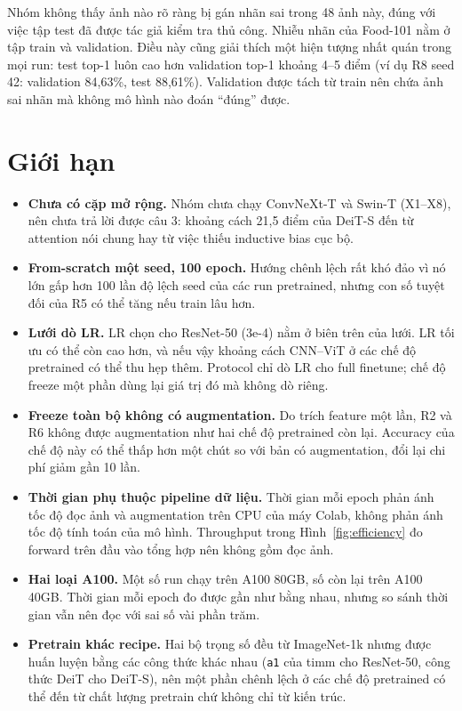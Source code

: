 \documentclass[12pt,a4paper]{article}
\begin{document}
Nhóm không thấy ảnh nào rõ ràng bị gán nhãn sai trong 48 ảnh này, đúng với việc tập
test đã được tác giả kiểm tra thủ công. Nhiễu nhãn của Food-101 nằm ở tập train và
validation. Điều này cũng giải thích một hiện tượng nhất quán trong mọi run: test
top-1 luôn cao hơn validation top-1 khoảng 4--5 điểm (ví dụ R8 seed 42: validation
84,63\%, test 88,61\%). Validation được tách từ train nên chứa ảnh sai nhãn mà không
mô hình nào đoán ``đúng'' được.

\section{Giới hạn}
\label{sec:limits}

\begin{itemize}
\item \textbf{Chưa có cặp mở rộng.} Nhóm chưa chạy ConvNeXt-T và Swin-T (X1--X8), nên
chưa trả lời được câu 3: khoảng cách 21,5 điểm của DeiT-S đến từ attention nói chung
hay từ việc thiếu inductive bias cục bộ.
\item \textbf{From-scratch một seed, 100 epoch.} Hướng chênh lệch rất khó đảo vì nó
lớn gấp hơn 100 lần độ lệch seed của các run pretrained, nhưng con số tuyệt đối của
R5 có thể tăng nếu train lâu hơn.
\item \textbf{Lưới dò LR.} LR chọn cho ResNet-50 (3e-4) nằm ở biên trên của lưới. LR
tối ưu có thể còn cao hơn, và nếu vậy khoảng cách CNN--ViT ở các chế độ pretrained có
thể thu hẹp thêm. Protocol chỉ dò LR cho full finetune; chế độ freeze một phần dùng
lại giá trị đó mà không dò riêng.
\item \textbf{Freeze toàn bộ không có augmentation.} Do trích feature một lần, R2 và R6
không được augmentation như hai chế độ pretrained còn lại. Accuracy của chế độ này có
thể thấp hơn một chút so với bản có augmentation, đổi lại chi phí giảm gần 10 lần.
\item \textbf{Thời gian phụ thuộc pipeline dữ liệu.} Thời gian mỗi epoch phản ánh tốc
độ đọc ảnh và augmentation trên CPU của máy Colab, không phản ánh tốc độ tính toán của
mô hình. Throughput trong Hình~\ref{fig:efficiency} đo forward trên đầu vào tổng hợp
nên không gồm đọc ảnh.
\item \textbf{Hai loại A100.} Một số run chạy trên A100 80GB, số còn lại trên A100
40GB. Thời gian mỗi epoch đo được gần như bằng nhau, nhưng so sánh thời gian vẫn nên
đọc với sai số vài phần trăm.
\item \textbf{Pretrain khác recipe.} Hai bộ trọng số đều từ ImageNet-1k nhưng được huấn
luyện bằng các công thức khác nhau (\texttt{a1} của timm cho ResNet-50, công thức DeiT
cho DeiT-S), nên một phần chênh lệch ở các chế độ pretrained có thể đến từ chất lượng
pretrain chứ không chỉ từ kiến trúc.
\end{itemize}
\end{document}
